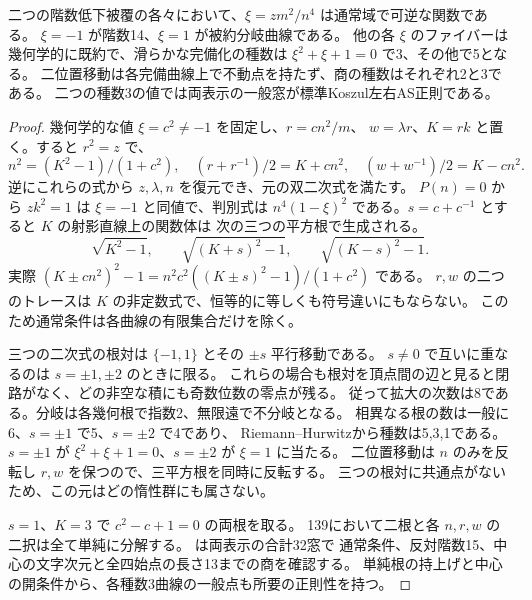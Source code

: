 \begin{proposition}\label{prop:rank-fifteen-pencil}
二つの階数低下被覆の各々において、$\xi=zm^2/n^4$ は通常域で可逆な関数である。
$\xi=-1$ が階数14、$\xi=1$ が被約分岐曲線である。
他の各 $\xi$ のファイバーは幾何学的に既約で、滑らかな完備化の種数は
$\xi^2+\xi+1=0$ で3、その他で5となる。
二位置移動は各完備曲線上で不動点を持たず、商の種数はそれぞれ2と3である。
二つの種数3の値では両表示の一般窓が標準Koszul左右AS正則である。
\end{proposition}
\begin{proof}
幾何学的な値 $\xi=c^2\ne-1$ を固定し、$r=cn^2/m$、
$w=\lambda r$、$K=rk$ と置く。すると $r^2=z$ で、
\[
 n^2=(K^2-1)/(1+c^2),\quad
 (r+r^{-1})/2=K+cn^2,\quad (w+w^{-1})/2=K-cn^2.
\]
逆にこれらの式から $z,\lambda,n$ を復元でき、元の双二次式を満たす。
$P(n)=0$ から $zk^2=1$ は $\xi=-1$ と同値で、判別式は
$n^4(1-\xi)^2$ である。$s=c+c^{-1}$ とすると $K$ の射影直線上の関数体は
次の三つの平方根で生成される。
\[
 \sqrt{K^2-1},\qquad \sqrt{(K+s)^2-1},\qquad \sqrt{(K-s)^2-1}.
\]
実際 $(K\pm cn^2)^2-1= n^2 c^2 ((K\pm s)^2-1)/(1+c^2)$ である。
$r,w$ の二つのトレースは $K$ の非定数式で、恒等的に等しくも符号違いにもならない。
このため通常条件は各曲線の有限集合だけを除く。

三つの二次式の根対は $\{-1,1\}$ とその $\pm s$ 平行移動である。
$s\ne0$ で互いに重なるのは $s=\pm1,\pm2$ のときに限る。
これらの場合も根対を頂点間の辺と見ると閉路がなく、どの非空な積にも奇数位数の零点が残る。
従って拡大の次数は8である。分岐は各幾何根で指数2、無限遠で不分岐となる。
相異なる根の数は一般に6、$s=\pm1$ で5、$s=\pm2$ で4であり、
Riemann--Hurwitzから種数は5,3,1である。$s=\pm1$ が
$\xi^2+\xi+1=0$、$s=\pm2$ が $\xi=1$ に当たる。
二位置移動は $n$ のみを反転し $r,w$ を保つので、三平方根を同時に反転する。
三つの根対に共通点がないため、この元はどの惰性群にも属さない。

$s=1$、$K=3$ で $c^2-c+1=0$ の両根を取る。
139において二根と各 $n,r,w$ の二択は全て単純に分解する。
 は両表示の合計32窓で
通常条件、反対階数15、中心の文字次元と全四始点の長さ13までの商を確認する。
単純根の持上げと中心の開条件から、各種数3曲線の一般点も所要の正則性を持つ。
\end{proof}

